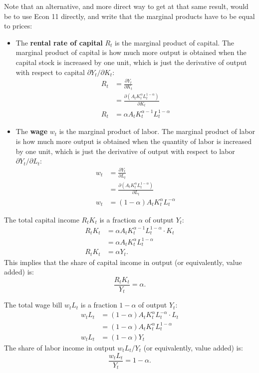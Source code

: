 \documentclass[]{book}
\providecommand{\tightlist}{%
  \setlength{\itemsep}{0pt}\setlength{\parskip}{0pt}}
\theoremstyle{definition}
\theoremstyle{definition}
\theoremstyle{definition}
\theoremstyle{remark}
\begin{document}
Note that an alternative, and more direct way to get at that same
result, would be to use Econ 11 directly, and write that the marginal
products have to be equal to prices:

\begin{itemize}
\tightlist
\item
  The \textbf{rental rate of capital} \(R_t\) is the marginal product of
  capital. The marginal product of capital is how much more output is
  obtained when the capital stock is increased by one unit, which is
  just the derivative of output with respect to capital
  \(\partial Y_t / \partial K_t\): \[
  \begin{aligned}
  R_t&=\frac{\partial Y_t}{\partial K_t}\\
  &= \frac{\partial \left(A_t K_t^{\alpha} L_t^{1-\alpha}\right)}{\partial K_t}\\
  R_t &= \alpha A_t K_t^{\alpha-1} L_t^{1-\alpha}
  \end{aligned}
  \]
\item
  The \textbf{wage} \(w_t\) is the marginal product of labor. The
  marginal product of labor is how much more output is obtained when the
  quantity of labor is increased by one unit, which is just the
  derivative of output with respect to labor
  \(\partial Y_t / \partial L_t\): \[
  \begin{aligned}
  w_t &=\frac{\partial Y_t}{\partial L_t}\\
  &= \frac{\partial \left(A_t K_t^{\alpha} L_t^{1-\alpha}\right)}{\partial L_t}\\
  w_t &= (1-\alpha) A_t K_t^{\alpha} L_t^{-\alpha}
  \end{aligned}
  \]
\end{itemize}

The total capital income \(R_t K_t\) is a fraction \(\alpha\) of output
\(Y_t\): \[
\begin{aligned}
R_t K_t &= \alpha A_t K_t^{\alpha-1} L_t^{1-\alpha} \cdot K_t \\
&= \alpha A_t K_t^{\alpha} L_t^{1-\alpha}\\
R_t K_t &= \alpha Y_t.
\end{aligned}
\] This implies that the share of capital income in output (or
equivalently, value added) is: \[\boxed{\frac{R_t K_t}{Y_t}=\alpha}.\]

The total wage bill \(w_t L_t\) is a fraction \(1-\alpha\) of output
\(Y_t\): \[
\begin{aligned}
w_t L_t &= (1-\alpha) A_t K_t^{\alpha} L_t^{-\alpha} \cdot L_t \\
&= (1-\alpha) A_t K_t^{\alpha} L_t^{1-\alpha}\\
w_t L_t &= (1-\alpha) Y_t
\end{aligned}
\] The share of labor income in output \(w_t L_t/Y_t\) (or equivalently,
value added) is: \[\boxed{\frac{w_t L_t}{Y_t}=1-\alpha}.\]
\end{document}
